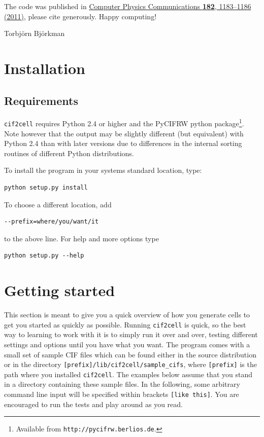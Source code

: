 \documentclass[11pt]{article}
\newcommand{\ciftocell}{\texttt{cif2cell}}
\begin{document}
The code was published in \href{http://dx.doi.org/10.1016/j.cpc.2011.01.013}{Computer Physics Communications {\bf 182}, 1183--1186 (2011)}, please cite generously. Happy computing!

\vspace{1.5cm}
Torbj\"orn Bj\"orkman


\newpage
\section{Installation}
\subsection{Requirements}
\ciftocell{} requires Python 2.4 or higher and the PyCIFRW python package\footnote{Available from \texttt{http://pycifrw.berlios.de}.}. Note however that the output may be slightly different (but equivalent) with Python 2.4 than with later versions due to differences in the internal sorting routines of different Python distributions.

To install the program in your systems standard location, type:
\begin{verbatim}
python setup.py install 
\end{verbatim}
To choose a different location, add 
\begin{verbatim}
--prefix=where/you/want/it 
\end{verbatim}
to the above line. For help and more options type
\begin{verbatim}
python setup.py --help
\end{verbatim}


\section{Getting started}

This section is meant to give you a quick overview of how you generate cells to get you started as quickly as possible. Running \ciftocell{} is quick, so the best way to learning to work with it is to simply run it over and over, testing different settings and options until you have what you want. The program comes with a small set of sample CIF files which can be found either in the source distribution or in the directory \texttt{[prefix]/lib/cif2cell/sample\_cifs}, where \texttt{[prefix]} is the path where you installed \ciftocell. The examples below assume that you stand in a directory containing these sample files. In the following, some arbitrary command line input will be specified within brackets \texttt{[like this]}. You are encouraged to run the tests and play around as you read.
\end{document}
